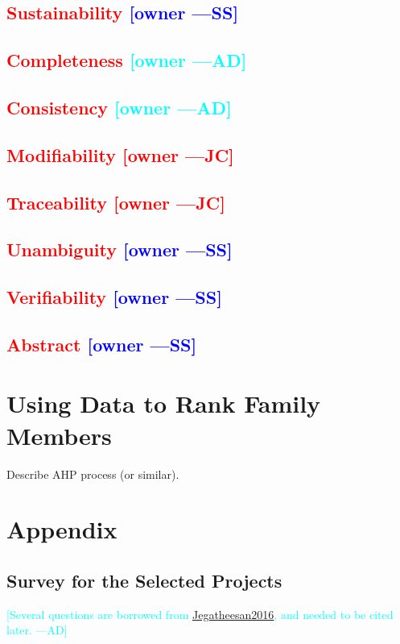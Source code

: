 \documentclass[letterpaper,cleveref]{lipics-v2019}
\newcommand{\authornote}[3]{\textcolor{#1}{[#3 ---#2]}}
\newcommand{\authornote}[3]{}
\newcommand{\wss}[1]{\authornote{blue}{SS}{#1}} %
\newcommand{\jc}[1]{\authornote{red}{JC}{#1}} %
\newcommand{\ad}[1]{\authornote{cyan}{AD}{#1}} %
\newcommand{\notdone}[1]{\textcolor{red}{#1}}
\theoremstyle{definition}
\begin{document}
\subsection{\notdone{Sustainability} \wss{owner}}

\subsection{\notdone{Completeness} \ad{owner}}

\subsection{\notdone{Consistency} \ad{owner}}

\subsection{\notdone{Modifiability} \jc{owner}}

\subsection{\notdone{Traceability} \jc{owner}}

\subsection{\notdone{Unambiguity} \wss{owner}}

\subsection{\notdone{Verifiability} \wss{owner}}

\subsection{\notdone{Abstract} \wss{owner}}

\section{Using Data to Rank Family Members}

Describe AHP process (or similar).

\appendix
\section{Appendix}
\subsection{Survey for the Selected Projects}
\ad{Several questions are borrowed from \href{https://gitlab.cas.mcmaster.ca/smiths/pub/-/blob/master/Jegatheesan2016.pdf}{Jegatheesan2016}, and needed to be cited later.}
\end{document}
